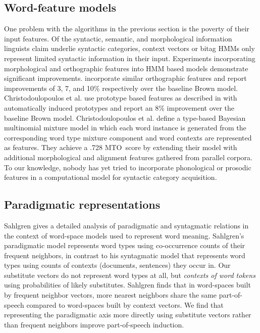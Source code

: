 \documentclass[11pt]{article}
\newcommand{\mto}{\mbox{MTO }}
\begin{document}
\subsection{Word-feature models}
One problem with the algorithms in the previous section is the poverty
of their input features.  Of the syntactic, semantic, and
morphological information linguists claim underlie syntactic
categories, context vectors or bitag HMMs only represent limited
syntactic information in their input.  Experiments incorporating
morphological and orthographic features into HMM based models
demonstrate significant improvements.
\cite{Clark:2003:CDM:1067807.1067817,bergkirkpatrick-klein:2010:ACL,blunsom-cohn:2011:ACL-HLT2011}
incorporate similar orthographic features and report improvements of
3, 7, and 10\% respectively over the baseline Brown model.
Christodoulopoulos et
al.  use
prototype based features as described in
\cite{Haghighi:2006:PLS:1220835.1220876} with automatically induced
prototypes and report an 8\% improvement over the baseline Brown
model.  Christodoulopoulos et
al. 
define a type-based Bayesian multinomial mixture model in which each
word instance is generated from the corresponding word type mixture
component and word contexts are represented as features.  They achieve
a .728 \mto score by extending their model with additional
morphological and alignment features gathered from parallel corpora.
To our knowledge, nobody has yet tried to incorporate phonological or
prosodic features in a computational model for syntactic category
acquisition.

\subsection{Paradigmatic representations}

Sahlgren  gives a detailed analysis of
paradigmatic and syntagmatic relations in the context of word-space
models used to represent word meaning.  Sahlgren's paradigmatic model
represents word types using co-occurrence counts of their frequent
neighbors, in contrast to his syntagmatic model that represents word
types using counts of contexts (documents, sentences) they occur in.
Our substitute vectors do not represent word types at all, but {\em
  contexts of word tokens} using probabilities of likely substitutes.
Sahlgren finds that in word-spaces built by frequent neighbor vectors,
more nearest neighbors share the same part-of-speech compared to
word-spaces built by context vectors.  We find that representing the
paradigmatic axis more directly using substitute vectors rather than
frequent neighbors improve part-of-speech induction.
\end{document}
